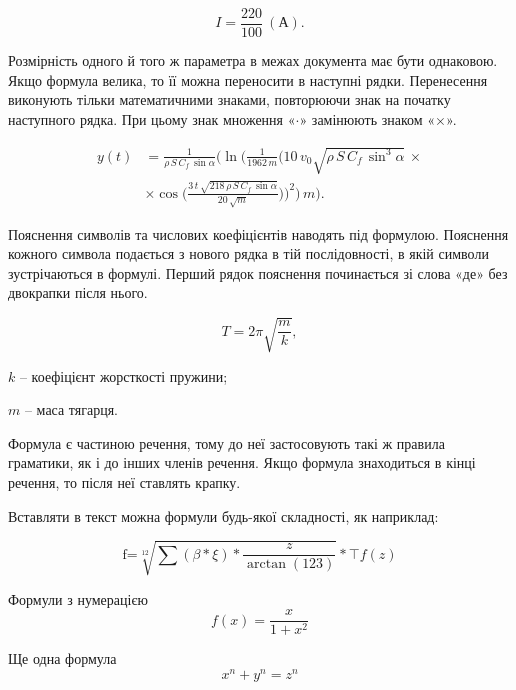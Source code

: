 $$I = \frac{220}{100}~(\text{А}).$$

Розмірність одного й того ж параметра в межах документа має бути однаковою. Якщо формула велика, то її можна переносити в на\-ступ\-ні рядки. Перенесення виконують тільки математичними знаками, повторюючи знак на початку наступного рядка. При цьому знак мно\-жен\-ня «$\cdot$» замінюють знаком «$\times$».


\begin{align}
\label{xt:eq}
y(t) &= \frac{1}{{\rho}\,{S}\,{C_{f}}\,\sin\alpha}\Big(\ln\Big(\frac{1}{1962\,m}\Big(10\,v_0\sqrt{\rho\,S\,C_f\,\sin^3\alpha}\,\times \nonumber\\  &\times\cos\Big(\frac{3\,t\,\sqrt{218\,\rho\,S\,C_f\,\sin\alpha}}{20\,\sqrt{m}}\Big)\Big)^2\Big)\,m\Big).
\end{align}


Пояснення символів та числових коефіцієнтів наводять під формулою. Пояснення кожного символа подається з нового рядка в тій послідовності, в якій символи зустрічаються в формулі. Перший рядок пояснення починається зі слова «де» без двокрапки після нього.

\begin{equation}
T = 2\pi\sqrt{\frac{m}{k}}, 
\end{equation}

\begin{explanation}
\fitem $k$ -- коефіцієнт жорсткості пружини; 
\item $m$ -- маса тягарця.
\end{explanation}

Формула є частиною речення, тому до неї застосовують такі ж правила граматики, як і до інших членів речення. Якщо формула зна\-хо\-дить\-ся в кінці речення, то після неї ставлять крапку. 

Вставляти в текст можна формули будь-якої складності, як наприклад:

\begin{equation}
	\text{f=}\sqrt[12]{\sum\left(\beta*\xi\right)*\frac{z}{\arctan(123)}}*\top f(z)
\end{equation}


Формули з нумерацією    
\begin{equation}
    f(x)=\frac{x}{1+x^2}
\end{equation}

Ще одна формула    
\begin{equation}
    x^n + y^n = z^n
\end{equation}
    
